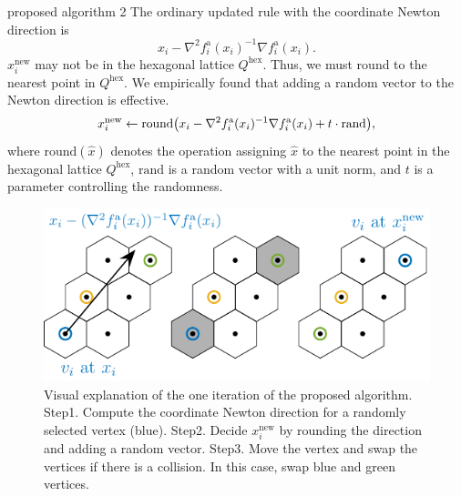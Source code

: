 \documentclass[dvipdfmx,13pt,aspectratio=169]{beamer}
\begin{document}
\begin{frame}{proposed algorithm 2}
  The ordinary updated rule with the coordinate Newton direction is
  \begin{equation*}
    x_i - \nabla^2 f^{\mathrm{a}}_i(x_i)^{-1} \nabla f^{\mathrm{a}}_i(x_i).
  \end{equation*}
  $x_i^\mathrm{new}$ may not be in the hexagonal lattice $Q^\mathrm{hex}$.
  Thus, we must round to the nearest point in $Q^\mathrm{hex}$.
  We empirically found that adding a random vector to the Newton direction is effective.
  \begin{equation*}
    x_i^\mathrm{new} \gets \mathrm{round}\qty(x_i - \nabla^2 f^{\mathrm{a}}_i(x_i)^{-1} \nabla f^{\mathrm{a}}_i(x_i) + t \cdot \text{rand}),
  \end{equation*}
  where $\mathrm{round}(\hat{x})$ denotes the operation assigning $\hat{x}$ to the nearest point in the hexagonal lattice $Q^\mathrm{hex}$, $\mathrm{rand}$ is a random vector with a unit norm, and $t$ is a parameter controlling the randomness.

  \begin{figure}[t]
    \centering
    \includegraphics[width=0.5\columnwidth]{../main/hex/hex.pdf}
    \caption{Visual explanation of the one iteration of the proposed algorithm. Step1. Compute the coordinate Newton direction for a randomly selected vertex (blue). Step2. Decide $x_i^\mathrm{new}$ by rounding the direction and adding a random vector. Step3. Move the vertex and swap the vertices if there is a collision. In this case, swap blue and green vertices.}
    \label{fig:hex}
  \end{figure}
\end{frame}
\end{document}
